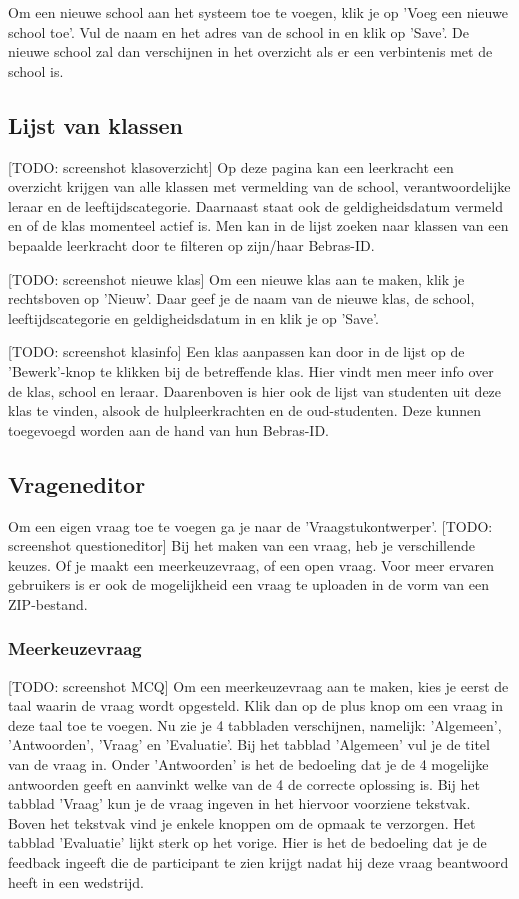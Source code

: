 \documentclass[]{article}
\begin{document}
Om een nieuwe school aan het systeem toe te voegen, klik je op 'Voeg een nieuwe school toe'. Vul de naam en het adres van de school in en klik op 'Save'. De nieuwe school zal dan verschijnen in het overzicht als er een verbintenis met de school is.

\subsection{Lijst van klassen}

[TODO: screenshot klasoverzicht]
Op deze pagina kan een leerkracht een overzicht krijgen van alle klassen met vermelding van de school, verantwoordelijke leraar en de leeftijdscategorie. Daarnaast staat ook de geldigheidsdatum vermeld en of de klas momenteel actief is.
Men kan in de lijst zoeken naar klassen van een bepaalde leerkracht door te filteren op zijn/haar Bebras-ID.

[TODO: screenshot nieuwe klas]
Om een nieuwe klas aan te maken, klik je rechtsboven op 'Nieuw'. Daar geef je de naam van de nieuwe klas, de school, leeftijdscategorie en geldigheidsdatum in en klik je op 'Save'.

[TODO: screenshot klasinfo]
Een klas aanpassen kan door in de lijst op de 'Bewerk'-knop te klikken bij de betreffende klas. Hier vindt men meer info over de klas, school en leraar. Daarenboven is hier ook de lijst van studenten uit deze klas te vinden, alsook de hulpleerkrachten en de oud-studenten. Deze kunnen toegevoegd worden aan de hand van hun Bebras-ID.

\subsection{Vrageneditor}

Om een eigen vraag toe te voegen ga je naar de 'Vraagstukontwerper'. [TODO: screenshot questioneditor] Bij het maken van een vraag, heb je verschillende keuzes. Of je maakt een meerkeuzevraag, of een open vraag. Voor meer ervaren gebruikers is er ook de mogelijkheid een vraag te uploaden in de vorm van een ZIP-bestand.

\subsubsection{Meerkeuzevraag}

[TODO: screenshot MCQ] Om een meerkeuzevraag aan te maken, kies je eerst de taal waarin de vraag wordt opgesteld. Klik dan op de plus knop om een vraag in deze taal toe te voegen. Nu zie je 4 tabbladen verschijnen, namelijk: 'Algemeen', 'Antwoorden', 'Vraag' en 'Evaluatie'. Bij het tabblad 'Algemeen' vul je de titel van de vraag in. Onder 'Antwoorden' is het de bedoeling dat je de 4 mogelijke antwoorden geeft en aanvinkt welke van de 4 de correcte oplossing is. Bij het tabblad 'Vraag' kun je de vraag ingeven in het hiervoor voorziene tekstvak. Boven het tekstvak vind je enkele knoppen om de opmaak te verzorgen. Het tabblad 'Evaluatie' lijkt sterk op het vorige. Hier is het de bedoeling dat je de feedback ingeeft die de participant te zien krijgt nadat hij deze vraag beantwoord heeft in een wedstrijd. 
\end{document}
